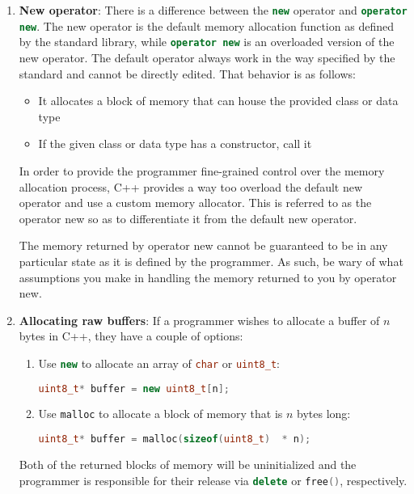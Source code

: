 \documentclass[letterpaper, 12pt]{article}
\newcommand{\inlinecode}[1]{\colorbox{codegrey}{\lstinline[language=C++]{#1}}}
\begin{document}
\begin{enumerate}
  \item {\bfseries New operator}:
  There is a difference between the \inlinecode{new} operator and \inlinecode{operator new}. The new operator 
  is the default memory allocation function as defined by the standard library, while \inlinecode{operator new} 
  is an overloaded version of the new operator. The default operator always work in the way specified by
  the standard and cannot be directly edited. That behavior is as follows:
  \begin{itemize}
   \item It allocates a block of memory that can house the provided class or data type
   \item If the given class or data type has a constructor, call it
  \end{itemize}
  In order to provide the programmer fine-grained control over the memory allocation process, C++
  provides a way too overload the default new operator and use a custom memory allocator. This is referred to
  as the operator new so as to differentiate it from the default new operator.
  \par\vspace{\baselineskip}
  The memory returned by operator new cannot be guaranteed to be in any particular state as it is 
  defined by the programmer. As such, be wary of what assumptions you make in handling the memory
  returned to you by operator new.

  \item {\bfseries Allocating raw buffers}:
  If a programmer wishes to allocate a buffer of $n$ bytes in C++, they have a couple of options:
  \begin{enumerate}
   \item Use \inlinecode{new} to allocate an array of \inlinecode{char} or \inlinecode{uint8_t}:
   \begin{lstlisting}[language=C++]
   uint8_t* buffer = new uint8_t[n];
   \end{lstlisting}
   \item Use \inlinecode{malloc} to allocate a block of memory that is $n$ bytes long:
   \begin{lstlisting}[language=C++]
   uint8_t* buffer = malloc(sizeof(uint8_t)  * n);
   \end{lstlisting}
  \end{enumerate}
  Both of the returned blocks of memory will be uninitialized and the programmer is responsible
  for their release via \inlinecode{delete} or \inlinecode{free()}, respectively.
  

\end{enumerate}
\end{document}
